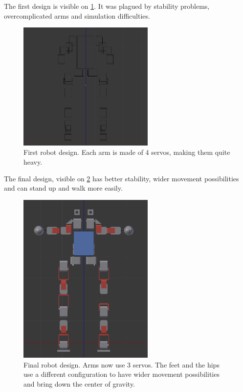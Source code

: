 The first design is visible on \cref{fig:first_robot}. It was plagued by stability problems, overcomplicated arms and simulation difficulties. 
\begin{figure}[htp]
\center
\includegraphics[width=0.6\textwidth]{figures/robot1}
\caption[Initial robot design]{First robot design. Each arm is made of 4 servos, making them quite heavy.}
\label{fig:first_robot}
\end{figure}

The final design, visible on \cref{fig:final_robot} has better stability, wider movement possibilities and can stand up and walk more easily. 
\begin{figure}[htp]
\center
\includegraphics[width=0.6\textwidth]{figures/robot2}
\caption[Final robot design]{Final robot design. Arms now use 3 servos. The feet and the hips use a different configuration to have wider movement possibilities and bring down the center of gravity.}
\label{fig:final_robot}
\end{figure}

